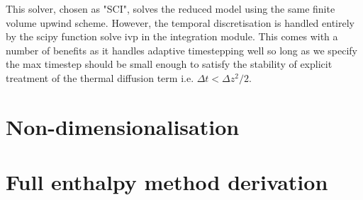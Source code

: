 \documentclass[a4paper,11pt]{article}
\numberwithin{equation}{section}
\begin{document}
This solver, chosen as "SCI", solves the reduced model using the same finite volume upwind scheme.
However, the temporal discretisation is handled entirely by the scipy function solve ivp in the integration module.
This comes with a number of benefits as it handles adaptive timestepping well so long as we specify the max timestep
should be small enough to satisfy the stability of explicit treatment of the thermal diffusion term i.e. $\Delta t < \Delta z^2 / 2$.





\section{Non-dimensionalisation}\label{sec:Non-dimensionalisation}


\section{Full enthalpy method derivation}\label{sec:full-enthalpy-method-derivation}





\end{document}
